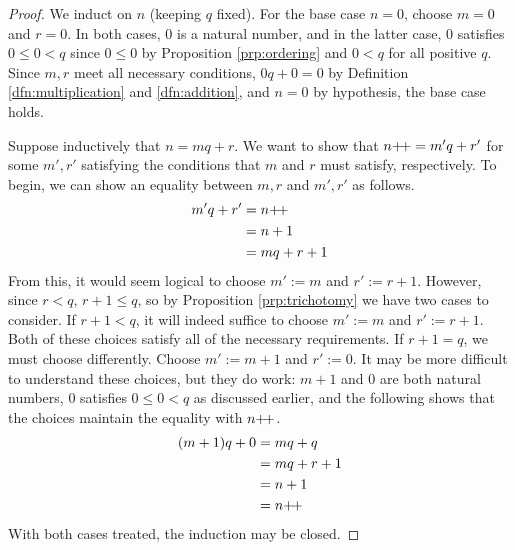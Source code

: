 \documentclass[../main.tex]{subfiles}
\begin{document}
\begin{enumerate}[ref={\thesection.\arabic*}]
\begin{prp}
        \begin{proof}
            We induct on $n$ (keeping $q$ fixed). For the base case $n=0$, choose $m=0$ and $r=0$. In both cases, 0 is a natural number, and in the latter case, 0 satisfies $0\leq 0<q$ since $0\leq 0$ by Proposition \ref{prp:ordering} and $0<q$ for all positive $q$. Since $m,r$ meet all necessary conditions, $0q+0=0$ by Definition \ref{dfn:multiplication} and \ref{dfn:addition}, and $n=0$ by hypothesis, the base case holds.\par
            Suppose inductively that $n=mq+r$. We want to show that $n{+\!+}=m'q+r'$ for some $m',r'$ satisfying the conditions that $m$ and $r$ must satisfy, respectively. To begin, we can show an equality between $m,r$ and $m',r'$ as follows.
            \begin{align*}
                m'q+r' &= n{+\!+}\\
                &= n+1\\
                &= mq+r+1
            \end{align*}
            From this, it would seem logical to choose $m':=m$ and $r':=r+1$. However, since $r<q$, $r+1\leq q$, so by Proposition \ref{prp:trichotomy} we have two cases to consider. If $r+1<q$, it will indeed suffice to choose $m':=m$ and $r':=r+1$. Both of these choices satisfy all of the necessary requirements. If $r+1=q$, we must choose differently. Choose $m':=m+1$ and $r':=0$. It may be more difficult to understand these choices, but they do work: $m+1$ and $0$ are both natural numbers, 0 satisfies $0\leq 0<q$ as discussed earlier, and the following shows that the choices maintain the equality with $n{+\!+}$.
            \begin{align*}
                (m+1)q+0 &= mq+q\\
                &= mq+r+1\\
                &= n+1\\
                &= n{+\!+}
            \end{align*}
            With both cases treated, the induction may be closed.
        \end{proof}
    \end{prp}
\end{enumerate}
\end{document}

